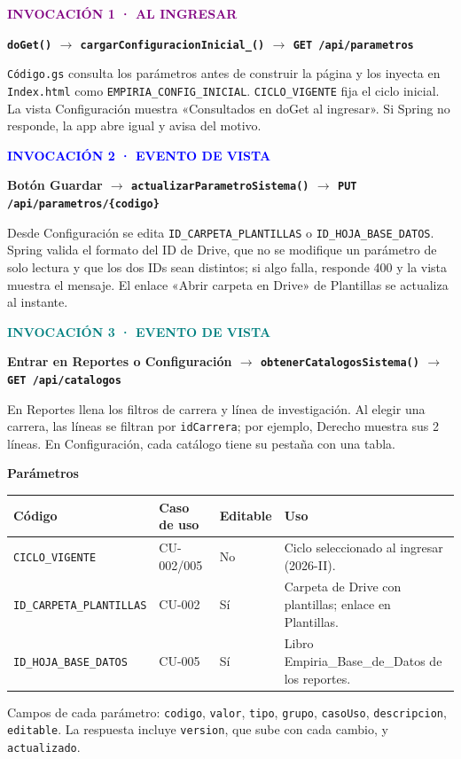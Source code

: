 \documentclass[11pt,a4paper]{article}
\newcommand{\paso}[4]{\begin{tcolorbox}[colback=#1!5!white,colframe=#1!40!white,boxrule=0.5pt,arc=2mm,left=3mm,right=3mm,top=2mm,bottom=2mm,before upper=\raggedright]\textcolor{#1}{\textbf{#2}}\par\textbf{#3}\par #4\end{tcolorbox}}
\newcommand{\cod}[1]{\texttt{#1}}
\begin{document}
\paso{purple}{INVOCACIÓN 1 · AL INGRESAR}{\cod{doGet()} $\rightarrow$ \cod{cargarConfiguracionInicial\_()} $\rightarrow$ \cod{GET /api/parametros}}{\cod{Código.gs} consulta los parámetros antes de construir la página y los inyecta en \cod{Index.html} como \cod{EMPIRIA\_CONFIG\_INICIAL}. \cod{CICLO\_VIGENTE} fija el ciclo inicial. La vista Configuración muestra «Consultados en doGet al ingresar». Si Spring no responde, la app abre igual y avisa del motivo.}
\paso{blue}{INVOCACIÓN 2 · EVENTO DE VISTA}{Botón Guardar $\rightarrow$ \cod{actualizarParametroSistema()} $\rightarrow$ \cod{PUT /api/parametros/\{codigo\}}}{Desde Configuración se edita \cod{ID\_CARPETA\_PLANTILLAS} o \cod{ID\_HOJA\_BASE\_DATOS}. Spring valida el formato del ID de Drive, que no se modifique un parámetro de solo lectura y que los dos IDs sean distintos; si algo falla, responde 400 y la vista muestra el mensaje. El enlace «Abrir carpeta en Drive» de Plantillas se actualiza al instante.}
\paso{teal}{INVOCACIÓN 3 · EVENTO DE VISTA}{Entrar en Reportes o Configuración $\rightarrow$ \cod{obtenerCatalogosSistema()} $\rightarrow$ \cod{GET /api/catalogos}}{En Reportes llena los filtros de carrera y línea de investigación. Al elegir una carrera, las líneas se filtran por \cod{idCarrera}; por ejemplo, Derecho muestra sus 2 líneas. En Configuración, cada catálogo tiene su pestaña con una tabla.}

\textbf{Parámetros}\par
\begin{tabularx}{\textwidth}{>{\raggedright\arraybackslash}p{44mm} p{24mm} p{20mm} >{\raggedright\arraybackslash}X}
\hline
\textbf{Código} & \textbf{Caso de uso} & \textbf{Editable} & \textbf{Uso} \\ \hline
\cod{CICLO\_VIGENTE} & CU-002/005 & No & Ciclo seleccionado al ingresar (2026-II). \\
\cod{ID\_CARPETA\_PLANTILLAS} & CU-002 & Sí & Carpeta de Drive con plantillas; enlace en Plantillas. \\
\cod{ID\_HOJA\_BASE\_DATOS} & CU-005 & Sí & Libro Empiria\_Base\_de\_Datos de los reportes. \\ \hline
\end{tabularx}
\par\vspace{2mm}
Campos de cada parámetro: \cod{codigo}, \cod{valor}, \cod{tipo}, \cod{grupo}, \cod{casoUso}, \cod{descripcion}, \cod{editable}. La respuesta incluye \cod{version}, que sube con cada cambio, y \cod{actualizado}.
\end{document}
